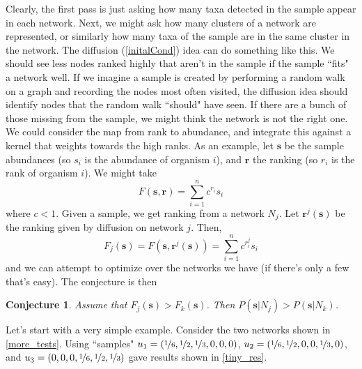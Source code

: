 \documentclass[10pt]{article}
\newtheorem{conj}{Conjecture}
\theoremstyle{definition}
\numberwithin{theorem}{section}
\numberwithin{definition}{section}
\numberwithin{lemma}{section}
\numberwithin{corollary}{section}
\numberwithin{clm}{section}
\numberwithin{rmk}{section}
\newcommand{\nhalf}{\nicefrac{1}{2}}
\renewcommand{\b}{\bm}
\begin{document}
Clearly, the first pass is just asking how many taxa detected in the sample appear in each network. Next, we might ask how many clusters of a network are represented, or similarly how many taxa of the sample are in the same cluster in the network. The diffusion (\cref{initalCond}) idea can do something like this. We should see less nodes ranked highly that aren't in the sample if the sample ``fits" a network well. If we imagine a sample is created by performing a random walk on a graph and recording the nodes most often visited, the diffusion idea should identify nodes that the random walk ``should" have seen. If there are a bunch of those missing from the sample, we might think the network is not the right one. We could consider the map from rank to abundance, and integrate this against a kernel that weights towards the high ranks. As an example, let $\b{s}$ be the sample abundances (so $s_i$ is the abundance of organism $i$), and $\b{r}$ the ranking (so $r_i$ is the rank of organism $i$). We might take 
\[
F(\b{s},\b{r}) = \sum_{i=1}^n c^{r_i} s_i
\]
where $c<1$. Given a sample, we get ranking from a network $N_j$. Let $\b{r}^j(\b{s})$ be the ranking given by diffusion on network $j$. Then,
\[
F_j(\b{s}) = F(\b{s},\b{r}^j(\b{s})) = \sum_{i=1}^n c^{r_i^j} s_i
\]
and we can attempt to optimize over the networks we have (if there's only a few that's easy). The conjecture is then
\begin{conj}
	Assume that $F_j(\b{s}) > F_k(\b{s})$. Then $P(\b{s}|N_j) > P(\b{s}|N_k)$.
\end{conj}



Let's start with a very simple example. Consider the two networks shown in \cref{more_tests}. Using ``samples" $u_1 = (\nicefrac{1}{6},\nhalf,\nicefrac{1}{3},0,0,0)$, $u_2 = (\nicefrac{1}{6},\nhalf,0,0,\nicefrac{1}{3},0)$, and $u_3= (0,0,0,\nicefrac{1}{6},\nhalf,\nicefrac{1}{3})$ gave results shown in \cref{tiny_res}.
\end{document}
